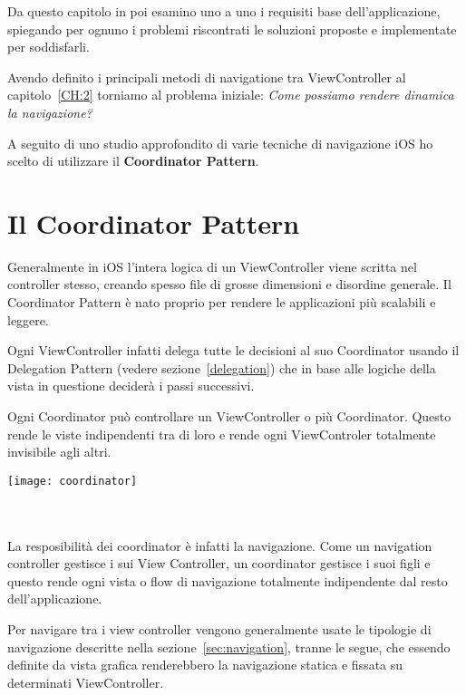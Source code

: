 

Da questo capitolo in poi esamino uno a uno i requisiti base dell'applicazione, spiegando per ognuno
i problemi riscontrati le soluzioni proposte e implementate per soddisfarli.

Avendo definito i principali metodi di navigatione tra ViewController al capitolo~\ref{CH:2} torniamo al problema iniziale:
\textit{Come possiamo rendere dinamica la navigazione?}

A seguito di uno studio approfondito di varie tecniche di navigazione iOS ho scelto di utilizzare il
\textbf{Coordinator Pattern}\cite{coordinatorpattern}.

\section{Il Coordinator Pattern}\label{sec:coordinator}

Generalmente in iOS l'intera logica di un ViewController viene scritta nel controller stesso, creando spesso
file di grosse dimensioni e disordine generale. Il Coordinator Pattern è nato proprio per rendere 
le applicazioni più scalabili e leggere. 

Ogni ViewController infatti delega tutte le decisioni al suo Coordinator usando il Delegation Pattern (vedere sezione~\ref{delegation}) che in base alle logiche
della vista in questione deciderà i passi successivi.

Ogni Coordinator può controllare un ViewController o più Coordinator. Questo rende le viste
indipendenti tra di loro e rende ogni ViewControler totalmente invisibile agli altri.\\

\begin{minipage}{\linewidth}
    \centering
    \texttt{[image: coordinator]}
    \label{fig:4}
\end{minipage} \\\\ 

La resposibilità dei coordinator è infatti la navigazione. Come un navigation controller gestisce i sui View Controller, un coordinator gestisce
i suoi figli e questo rende ogni vista o flow di navigazione totalmente indipendente dal resto dell'applicazione.

Per navigare tra i view controller vengono generalmente usate le tipologie di navigazione
descritte nella sezione~\ref{sec:navigation}, tranne le segue, che essendo definite da vista grafica renderebbero
la navigazione statica e fissata su determinati ViewController. \\

